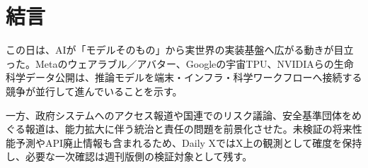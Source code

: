 \section*{結言}
この日は、AIが「モデルそのもの」から実世界の実装基盤へ広がる動きが目立った。Metaのウェアラブル／アバター、Googleの宇宙TPU、NVIDIAらの生命科学データ公開は、推論モデルを端末・インフラ・科学ワークフローへ接続する競争が並行して進んでいることを示す。

一方、政府システムへのアクセス報道や国連でのリスク議論、安全基準団体をめぐる報道は、能力拡大に伴う統治と責任の問題を前景化させた。未検証の将来性能予測やAPI廃止情報も含まれるため、Daily XではX上の観測として確度を保持し、必要な一次確認は週刊版側の検証対象として残す。
